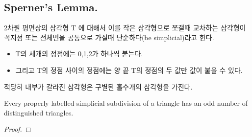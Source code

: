 \subsubsection{} 

\subsection{Sperner's Lemma.}
2차원 평면상의 삼각형 T 에 대해서 이를 작은 삼각형으로 쪼갤때 교차하는 삼각형이 꼭지점 또는 전체면을 공통으로 가질때 단순하다(be simplicial)라고 한다.



\begin{itemize}
    \item T의 세개의 정점에는 0,1,2가 하나씩 붙는다.
    \item 그리고 T의 정점 사이의 정점에는 양 끝 T의 정점의 두 값만 값이 붙을 수 있다.
\end{itemize}




\begin{theorem}
    적당히 내부가 갈라진 삼각형은 구별된 홀수개의 삼각형을 가진다.

    Every properly labelled simplicial subdivision of a triangle has an odd number of distinguished triangles.
\end{theorem}

\begin{proof}
    
\end{proof}